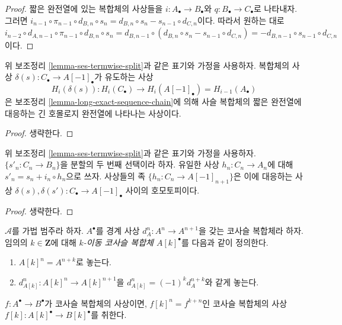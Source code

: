 \begin{proof}
짧은 완전열에 있는 복합체의 사상들을
$i : A_\bullet \to B_\bullet$와 $q : B_\bullet \to C_\bullet$로
나타내자. 그러면
$i_{n - 1} \circ \pi_{n - 1} \circ d_{B, n} \circ s_n =
d_{B, n} \circ s_n - s_{n - 1} \circ d_{C, n}$이다. 따라서 원하는
대로
$i_{n - 2} \circ d_{A, n - 1} \circ \pi_{n - 1} \circ d_{B, n} \circ s_n =
d_{B, n - 1} \circ (d_{B, n} \circ s_n - s_{n - 1} \circ d_{C, n}) =
- d_{B, n - 1} \circ s_{n - 1} \circ d_{C, n}$이다.
\end{proof}

\begin{lemma}
\label{lemma-ses-termwise-split-long}
위 보조정리 \ref{lemma-ses-termwise-split}과 같은 표기와 가정을
사용하자. 복합체의 사상
$\delta(s) : C_\bullet \to A[-1]_\bullet$가 유도하는 사상
$$
H_i(\delta(s)) :
H_i(C_\bullet) \longrightarrow H_i(A[-1]_\bullet) = H_{i - 1}(A_\bullet)
$$
은 보조정리 \ref{lemma-long-exact-sequence-chain}에 의해 사슬 복합체의
짧은 완전열에 대응하는 긴 호몰로지 완전열에 나타나는 사상이다.
\end{lemma}

\begin{proof}
생략한다.
\end{proof}

\begin{lemma}
\label{lemma-ses-termwise-split-homotopy}
위 보조정리 \ref{lemma-ses-termwise-split}과 같은 표기와 가정을
사용하자. $\{s'_n : C_n \to B_n\}$을 분할의 두 번째 선택이라 하자.
유일한 사상 $h_n : C_n \to A_n$에 대해
$s'_n = s_n + i_n \circ h_n$으로 쓰자.
사상들의 족 $\{h_n : C_n \to A[-1]_{n + 1}\}$은 이에 대응하는
사상 $\delta(s), \delta(s') : C_\bullet \to A[-1]_\bullet$ 사이의
호모토피이다.
\end{lemma}

\begin{proof}
생략한다.
\end{proof}

\begin{definition}
\label{definition-shift-cochain}
$\mathcal{A}$를 가법 범주라 하자.
$A^\bullet$를 경계 사상 $d_A^n : A^n \to A^{n + 1}$을 갖는 코사슬
복합체라 하자. 임의의 $k \in \mathbf{Z}$에 대해
{\it $k$-이동 코사슬 복합체 $A[k]^\bullet$}를 다음과 같이 정의한다.
\begin{enumerate}
\item $A[k]^n = A^{n + k}$로 놓는다.
\item $d_{A[k]}^n : A[k]^n \to A[k]^{n + 1}$을
$d_{A[k]}^n = (-1)^k d_A^{n + k}$와 같게 놓는다.
\end{enumerate}
$f : A^\bullet \to B^\bullet$가 코사슬 복합체의 사상이면,
$f[k]^n = f^{k + n}$인 코사슬 복합체의 사상
$f[k] : A[k]^\bullet \to B[k]^\bullet$를 취한다.
\end{definition}

